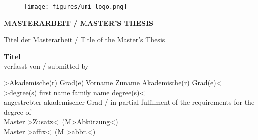 ﻿\begin{titlepage}

\begin{center}
\begin{figure}
\hspace{9.1cm}
\texttt{[image: figures/uni\_logo.png]}
\end{figure}
\vspace*{2.1cm}

\fontsize{22}{0} \selectfont \textbf{ MASTERARBEIT / MASTER'S THESIS}\\
\vspace*{2.5cm}

\fontsize{11}{0} \selectfont Titel der Masterarbeit / Title of the Master's Thesis\\
\vspace*{0.4cm}

\fontsize{18}{0} \selectfont \textbf{\glqq Titel\grqq}\\

\vspace*{2.8cm}
{\fontsize{11}{0} \selectfont verfasst von / submitted by}\\
\vspace*{0.4cm}

{ \fontsize{14}{0} \selectfont \textgreater Akademische(r) Grad(e) Vorname Zuname Akademische(r) Grad(e)\textless\\
\textgreater degree(s) first name family name degree(s)\textless}\\
\vspace*{1.6cm}
{ \fontsize{11}{0} \selectfont angestrebter akademischer Grad / in partial fulfilment of the requirements for the degree of}\\
\vspace*{0.4cm}
{ \fontsize{14}{0} \selectfont  Master \textgreater Zusatz\textless \ (M\textgreater Abk\"urzung\textless)\\
Master \textgreater affix\textless \ (M \textgreater abbr.\textless)}\\
\vspace*{2.4cm}


\end{center}
\end{titlepage}
